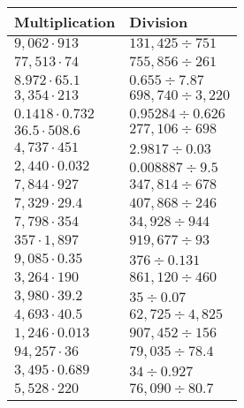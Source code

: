 \begin{longtable}[]{@{}ll@{}}
\toprule
Multiplication & Division\tabularnewline
\midrule
\endhead
\(9,062\cdot913\) & \(131,425÷751\)\tabularnewline
\(77,513\cdot74\) & \(755,856÷261\)\tabularnewline
\(8.972\cdot65.1\) & \(0.655÷7.87\)\tabularnewline
\(3,354\cdot213\) & \(698,740÷3,220\)\tabularnewline
\(0.1418\cdot0.732\) & \(0.95284÷0.626\)\tabularnewline
\(36.5\cdot508.6\) & \(277,106÷698\)\tabularnewline
\(4,737\cdot451\) & \(2.9817÷0.03\)\tabularnewline
\(2,440\cdot0.032\) & \(0.008887÷9.5\)\tabularnewline
\(7,844\cdot927\) & \(347,814÷678\)\tabularnewline
\(7,329\cdot29.4\) & \(407,868÷246\)\tabularnewline
\(7,798\cdot354\) & \(34,928÷944\)\tabularnewline
\(357\cdot1,897\) & \(919,677÷93\)\tabularnewline
\(9,085\cdot0.35\) & \(376÷0.131\)\tabularnewline
\(3,264\cdot190\) & \(861,120÷460\)\tabularnewline
\(3,980\cdot39.2\) & \(35÷0.07\)\tabularnewline
\(4,693\cdot40.5\) & \(62,725÷4,825\)\tabularnewline
\(1,246\cdot0.013\) & \(907,452÷156\)\tabularnewline
\(94,257\cdot36\) & \(79,035÷78.4\)\tabularnewline
\(3,495\cdot0.689\) & \(34÷0.927\)\tabularnewline
\(5,528\cdot220\) & \(76,090÷80.7\)\tabularnewline
\bottomrule
\end{longtable}
